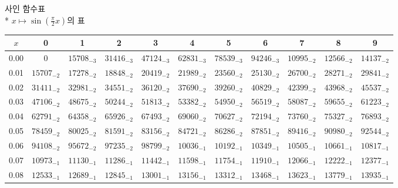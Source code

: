 \documentclass[10pt, a4paper]{article}
\begin{document}
\pagebreak
\begin{center}
    \huge{사인 함수표}\normalsize\\
    * \(x \longmapsto \sin\left(\frac{\pi}{2}x\right)\)의 표
    \begin{longtable}{c | c c c c c | c c c c c}
        \(x\) & 0 & 1 & 2 & 3 & 4 & 5 & 6 & 7 & 8 & 9\\
        \hline\hline
        0.00 & 0 & \({15708}_{-3}\) & \({31416}_{-3}\) & \({47124}_{-3}\) & \({62831}_{-3}\) & \({78539}_{-3}\) & \({94246}_{-3}\) & \({10995}_{-2}\) & \({12566}_{-2}\) & \({14137}_{-2}\)\\
        0.01 & \({15707}_{-2}\) & \({17278}_{-2}\) & \({18848}_{-2}\) & \({20419}_{-2}\) & \({21989}_{-2}\) & \({23560}_{-2}\) & \({25130}_{-2}\) & \({26700}_{-2}\) & \({28271}_{-2}\) & \({29841}_{-2}\)\\
        0.02 & \({31411}_{-2}\) & \({32981}_{-2}\) & \({34551}_{-2}\) & \({36120}_{-2}\) & \({37690}_{-2}\) & \({39260}_{-2}\) & \({40829}_{-2}\) & \({42399}_{-2}\) & \({43968}_{-2}\) & \({45537}_{-2}\)\\
        0.03 & \({47106}_{-2}\) & \({48675}_{-2}\) & \({50244}_{-2}\) & \({51813}_{-2}\) & \({53382}_{-2}\) & \({54950}_{-2}\) & \({56519}_{-2}\) & \({58087}_{-2}\) & \({59655}_{-2}\) & \({61223}_{-2}\)\\
        0.04 & \({62791}_{-2}\) & \({64358}_{-2}\) & \({65926}_{-2}\) & \({67493}_{-2}\) & \({69060}_{-2}\) & \({70627}_{-2}\) & \({72194}_{-2}\) & \({73760}_{-2}\) & \({75327}_{-2}\) & \({76893}_{-2}\)\\
        0.05 & \({78459}_{-2}\) & \({80025}_{-2}\) & \({81591}_{-2}\) & \({83156}_{-2}\) & \({84721}_{-2}\) & \({86286}_{-2}\) & \({87851}_{-2}\) & \({89416}_{-2}\) & \({90980}_{-2}\) & \({92544}_{-2}\)\\
        0.06 & \({94108}_{-2}\) & \({95672}_{-2}\) & \({97235}_{-2}\) & \({98799}_{-2}\) & \({10036}_{-1}\) & \({10192}_{-1}\) & \({10349}_{-1}\) & \({10505}_{-1}\) & \({10661}_{-1}\) & \({10817}_{-1}\)\\
        0.07 & \({10973}_{-1}\) & \({11130}_{-1}\) & \({11286}_{-1}\) & \({11442}_{-1}\) & \({11598}_{-1}\) & \({11754}_{-1}\) & \({11910}_{-1}\) & \({12066}_{-1}\) & \({12222}_{-1}\) & \({12377}_{-1}\)\\
        0.08 & \({12533}_{-1}\) & \({12689}_{-1}\) & \({12845}_{-1}\) & \({13001}_{-1}\) & \({13156}_{-1}\) & \({13312}_{-1}\) & \({13468}_{-1}\) & \({13623}_{-1}\) & \({13779}_{-1}\) & \({13935}_{-1}\)\\

\end{longtable}
\end{center}
\end{document}
